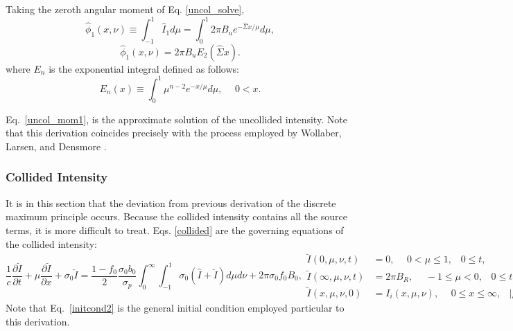Taking the zeroth angular moment of Eq. \eqref{uncol_solve},
\[\hat\phi_1(x,\nu)\equiv\int_{-1}^1\hat I_1d\mu =
  \int_0^1 2\pi B_ue^{-\hat\Sigma x/\mu}d\mu,\]
\begin{equation} \label{uncol_mom1}
\hat\phi_1(x,\nu)=2\pi B_uE_2(\hat\Sigma x).
\end{equation}
where $E_n$ is the exponential integral defined as follows:
\[E_n(x)\equiv\int_0^1\mu^{n-2}e^{-x/\mu}d\mu,\hspace{15pt}0<x.\]

Eq.\ \eqref{uncol_mom1}, is the approximate solution of the
uncollided intensity.  Note that this derivation coincides precisely with the
process employed by Wollaber, Larsen, and Densmore \cite{WolLarDen}.

\subsubsection{Collided Intensity}
It is in this section that the deviation from previous derivation of the
discrete maximum principle occurs.  Because the collided intensity contains
all the source terms, it is more difficult to treat.  Eqs.
\eqref{collided} are the governing equations of the collided intensity:
\begin{subequations}\label{collided}
\begin{equation}
\frac{1}{c}\frac{\partial\breve I}{\partial t} + 
  \mu\frac{\partial\breve I}{\partial x} + \sigma_0\breve I =
  \frac{1-f_0}{2}\frac{\sigma_0b_0}{\sigma_p}\int_0^\infty\int_{-1}^1
    \sigma_0(\hat I+\breve I)d\mu d\nu +
  2\pi\sigma_0f_0B_0,
\end{equation}
\begin{align}
\breve I(0,\mu,\nu,t)&=0,\hspace{15pt} 0<\mu\leq1, \hspace{10pt}0\leq t,\\
\breve I(\infty,\mu,\nu,t)&=2\pi B_R,\hspace{15pt}
  -1\leq\mu<0,\hspace{10pt}0\leq t,\\
\breve I(x,\mu,\nu,0)&=I_i(x,\mu,\nu), \hspace{15pt}0\leq
  x\leq\infty,\hspace{10pt}|\mu|\leq1 \label{initcond2}.
\end{align}
\end{subequations}
Note that Eq.\ \eqref{initcond2} is the general initial condition employed
particular to this derivation.

